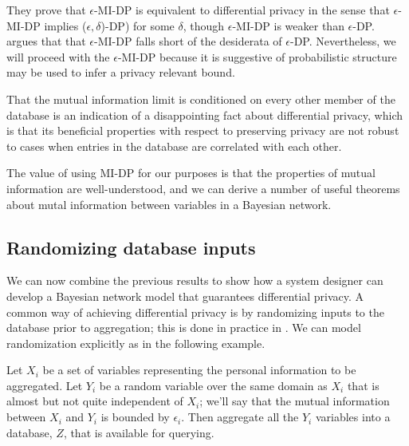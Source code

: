 \documentclass[../thesis.tex]{subfiles}
\begin{document}
They prove that $\epsilon$-MI-DP is equivalent to differential
privacy in the sense that $\epsilon$-MI-DP implies
($\epsilon,\delta$)-DP) for some $\delta$, though
$\epsilon$-MI-DP is weaker than $\epsilon$-DP.
\citet{mcsherry_2017} argues that that $\epsilon$-MI-DP
falls short of the desiderata of $\epsilon$-DP.
Nevertheless, we will proceed with the
$\epsilon$-MI-DP because it is suggestive of
probabilistic structure may be used to
infer a privacy relevant bound.

That the mutual information limit
is conditioned on every other member of the database is
an indication of a disappointing fact about differential
privacy, which is that its beneficial properties
with respect to preserving privacy are not robust
to cases when entries in the database are correlated with each
other.

The value of using MI-DP for our purposes is that
the properties of mutual information are well-understood,
and we can derive a number of useful theorems
about mutal information between variables in a Bayesian
network.

\subsection{Randomizing database inputs}

We can now combine the previous results to
show how a system designer can develop a
Bayesian network model that guarantees
differential privacy.
A common way of achieving differential privacy
is by randomizing inputs to the database
prior to aggregation; this is done in practice
in \citet{erlingsson2014rappor}.
We can model randomization explicitly as in
the following example.

Let $X_i$ be a set of variables representing the
personal information to be aggregated.
Let $Y_i$ be a random variable over the same domain
as $X_i$ that is almost but not quite independent
of $X_i$; we'll say that the mutual information between
$X_i$ and $Y_i$ is bounded by $\epsilon_i$.
Then aggregate all the $Y_i$ variables into a database,
$Z$, that is available for querying.

\begin{center}
\end{center}
\end{document}
